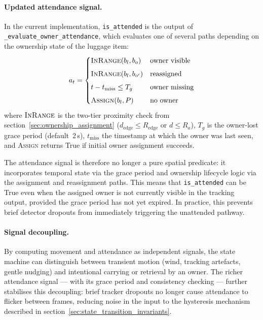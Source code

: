 \paragraph{Updated attendance signal.}

In the current implementation, \texttt{is\_attended} is the output of
\texttt{\_evaluate\_owner\_attendance}, which evaluates one of several paths
depending on the ownership state of the luggage item:
\begin{equation}
	a_t = \begin{cases}
		\textsc{InRange}(b_l, b_o)
		 & \text{owner visible} \\[1ex]
		\textsc{InRange}(b_l, b_{o'})
		 & \text{reassigned}    \\[1ex]
		t - t_{\text{miss}} \le T_g
		 & \text{owner missing} \\[1ex]
		\textsc{Assign}(b_l, P)
		 & \text{no owner}
	\end{cases}
\end{equation}
where $\textsc{InRange}$ is the two-tier proximity
check from section~\ref{sec:ownership_assignment}
($d_{\text{edge}} \le R_{\text{edge}}$ or $d \le R_a$), $T_g$ is the
owner-lost grace period (default~2\,s), $t_{\text{miss}}$ the timestamp at
which the owner was last seen, and \textsc{Assign} returns True if initial
owner assignment succeeds.

The attendance signal is therefore no longer a pure spatial predicate: it
incorporates temporal state via the grace period and ownership lifecycle logic
via the assignment and reassignment paths. This means that
\texttt{is\_attended} can be True even when the assigned owner is not currently
visible in the tracking output, provided the grace period has not yet expired.
In practice, this prevents brief detector dropouts from immediately triggering
the unattended pathway.

\paragraph{Signal decoupling.}

By computing movement and attendance as independent signals, the state machine
can distinguish between transient motion (wind, tracking artefacts, gentle
nudging) and intentional carrying or retrieval by an owner. The richer
attendance signal --- with its grace period and consistency checking ---
further stabilises this decoupling: brief tracker dropouts no longer cause
attendance to flicker between frames, reducing noise in the input to the
hysteresis mechanism described in
section~\ref{sec:state_transition_invariants}.


